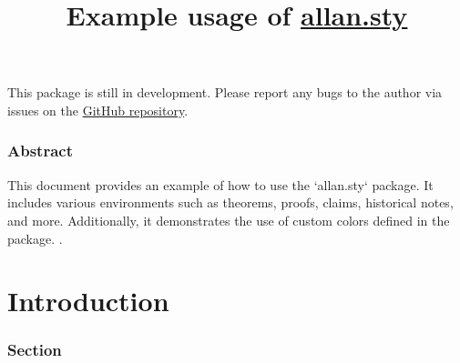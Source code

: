 \documentclass[UTF8, 12pt]{extarticle}
\title{\textbf{\color{allandarkblue}Example usage of \url{allan.sty}}}
\begin{document}
    \maketitle
    \tableofcontents
    \begin{mdframed}[style=allancadetbluebox, frametitle={Warning}]
        This package is still in development. Please report any bugs to the author via issues on the \href{https://github.com/MathxStudio/LaTeX_template}{GitHub repository}.
    \end{mdframed}

    \newpage
    \section*{Abstract}
    This document provides an example of how to use the `allan.sty` package. It includes various environments such as theorems, proofs, claims, historical notes, and more. Additionally, it demonstrates the use of custom colors defined in the package.
.
    \listoftheorems[ignoreall,show={theorem,lemma,claim}]

    \part{Introduction}
    \section{Section}
\end{document}
